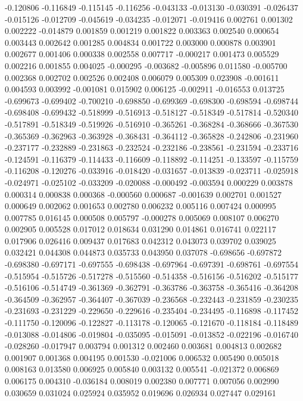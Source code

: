 -0.120806
-0.116849
-0.115145
-0.116256
-0.043133
-0.013130
-0.030391
-0.026437
-0.015126
-0.012709
-0.045619
-0.034235
-0.012071
-0.019416
0.002761
0.001302
0.002222
-0.014879
0.001859
0.001219
0.001822
0.003363
0.002540
0.000654
0.003443
0.002642
0.001285
0.004834
0.001722
0.003000
0.000878
0.003901
0.002677
0.001406
0.000338
0.002558
0.007717
-0.000217
0.001473
0.005529
0.002216
0.001855
0.004025
-0.000295
-0.003682
-0.005896
0.011580
-0.005700
0.002368
0.002702
0.002526
0.002408
0.006079
0.005309
0.023908
-0.001611
0.004593
0.003992
-0.001081
0.015902
0.006125
-0.002911
-0.016553
0.013725
-0.699673
-0.699402
-0.700210
-0.698850
-0.699369
-0.698300
-0.698594
-0.698744
-0.698408
-0.699432
-0.518999
-0.516913
-0.518127
-0.518349
-0.517814
-0.520340
-0.517891
-0.518349
-0.519926
-0.516910
-0.365261
-0.368284
-0.368666
-0.367530
-0.365369
-0.362963
-0.363928
-0.368431
-0.364112
-0.365828
-0.242806
-0.231960
-0.237177
-0.232889
-0.231863
-0.232524
-0.232186
-0.238561
-0.231594
-0.233716
-0.124591
-0.116379
-0.114433
-0.116609
-0.118892
-0.114251
-0.133597
-0.115759
-0.116208
-0.120276
-0.033916
-0.018420
-0.031657
-0.013839
-0.023711
-0.025918
-0.024971
-0.025102
-0.033209
-0.020088
-0.000492
-0.003594
0.000229
0.003878
0.000314
0.000838
0.000368
-0.000560
0.000687
-0.001639
0.002701
0.001527
0.000649
0.002062
0.001653
0.002780
0.006232
0.005116
0.007424
0.000995
0.007785
0.016145
0.000508
0.005797
-0.000278
0.005069
0.008107
0.006270
0.002905
0.005528
0.017012
0.018634
0.031290
0.014861
0.016741
0.022117
0.017906
0.026416
0.009437
0.017683
0.042312
0.043073
0.039702
0.039025
0.032421
0.044308
0.044873
0.035733
0.043950
0.037078
-0.698656
-0.697872
-0.698380
-0.697171
-0.697555
-0.698438
-0.697964
-0.697391
-0.698761
-0.697554
-0.515954
-0.515726
-0.517278
-0.515560
-0.514358
-0.516156
-0.516202
-0.515177
-0.516106
-0.514749
-0.361369
-0.362791
-0.363786
-0.363758
-0.365416
-0.364208
-0.364509
-0.362957
-0.364407
-0.367039
-0.236568
-0.232443
-0.231859
-0.230235
-0.231693
-0.231229
-0.229650
-0.229616
-0.235404
-0.234495
-0.116898
-0.117452
-0.111750
-0.120096
-0.122827
-0.113178
-0.120065
-0.121670
-0.118184
-0.118489
-0.013088
-0.014806
-0.019804
-0.035095
-0.015091
-0.013852
-0.022196
-0.016740
-0.028260
-0.017947
0.003794
0.001312
0.002460
0.003681
0.004813
0.002682
0.001907
0.001368
0.004195
0.001530
-0.021006
0.006532
0.005490
0.005018
0.008163
0.013580
0.006925
0.005840
0.003132
0.005541
-0.021372
0.006869
0.006175
0.004310
-0.036184
0.008019
0.002380
0.007771
0.007056
0.002990
0.030659
0.031024
0.025924
0.035952
0.019696
0.026934
0.027447
0.029161

